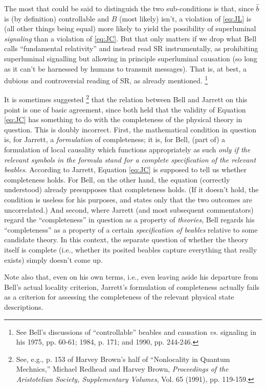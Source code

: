 \documentclass[12pt]{article}
\begin{document}
The most that could be said to distinguish the two sub-conditions is that,
since $\hat{b}$ is (by definition) controllable and $B$ (most likely) 
isn't, a violation of \ref{eq:JL} is (all other things being equal) 
more likely to yield the possibility of superluminal \emph{signaling}
than a violation of \ref{eq:JC}.  But that only matters if we drop
what Bell calls ``fundamental relativity'' and instead read SR
instrumentally, as prohibiting superluminal signalling but allowing in
principle superluminal causation (so long as it can't be harnessed by
humans to transmit messages).   That is, at best, a dubious and 
controversial reading of SR, as already mentioned.  \footnote{See Bell's
discussions of ``controllable'' beables and causation \emph{vs.} 
signaling in his 1975, pp. 60-61; 1984, p. 171; and 1990, pp. 244-246.}

It is sometimes suggested 
\footnote{See, e.g., p. 153 of Harvey Brown's half of ``Nonlocality in Quantum
  Mechnics,''  Michael Redhead and Harvey Brown, \emph{Proceedings of
    the Aristotelian Society, Supplementary Volumes}, Vol. 65 (1991),
  pp. 119-159.}
that the relation between Bell and Jarrett
on this point is one of basic agreement, since both held that the
validity of Equation \ref{eq:JC}
has something to do with the completeness of the physical theory in
question.  This is doubly incorrect.  First, the mathematical
condition in question is, for Jarrett, a \emph{formulation} of
completeness; it is, for Bell, (part of) a formulation of local
causality which functions appropriately as such \emph{only if the 
relevant symbols in the formula stand for a complete specification 
of the relevant beables}.  According to Jarrett, Equation \ref{eq:JC} is
supposed to tell us whether completeness holds.  For Bell, on the
other hand, the equation (correctly understood) already presupposes
that completeness holds.  (If it doesn't hold, the condition is useless for
his purposes, and states only that the two outcomes are uncorrelated.)  
And second, where Jarrett (and most subsequent commentators)
regard the ``completeness'' in question as a property of
\emph{theories}, Bell regards his ``completeness'' as a property of a
certain \emph{specification of beables} relative to some candidate
theory.  In this context, the separate question of whether the theory
itself is complete (i.e., whether its posited beables capture
everything that really exists) simply doesn't come up.

Note also that, even on his own terms, i.e., even leaving aside his 
departure from Bell's actual
locality criterion, Jarrett's formulation of completeness actually
fails as a criterion for assessing the completeness of the relevant
physical state descriptions.
\end{document}
